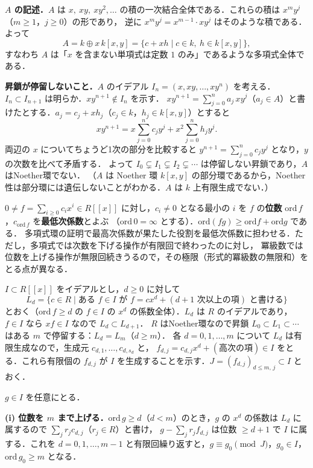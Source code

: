 \textbf{$A$ の記述．}$A$ は $x,\ xy,\ xy^2,\dots$ の積の一次結合全体である．これらの積は $x^my^j$（$m\ge1$，$j\ge0$）の形であり，
逆に $x^my^j=x^{m-1}\cdot xy^j$ はそのような積である．よって
\[
  A=k\oplus x\,k[x,y]=\{c+xh\mid c\in k,\ h\in k[x,y]\},
\]
すなわち $A$ は「$x$ を含まない単項式は定数 $1$ のみ」であるような多項式全体である．

\textbf{昇鎖が停留しないこと．}$A$ のイデアル $I_n=(x,xy,\dots,xy^n)$ を考える．$I_n\subset I_{n+1}$ は明らか．$xy^{n+1}\notin I_n$ を示す．
$xy^{n+1}=\sum_{j=0}^na_j\,xy^j$（$a_j\in A$）と書けたとする．$a_j=c_j+xh_j$（$c_j\in k$，$h_j\in k[x,y]$）とすると
\[
  xy^{n+1}=x\sum_{j=0}^nc_jy^j+x^2\sum_{j=0}^nh_jy^j.
\]
両辺の $x$ についてちょうど1次の部分を比較すると $y^{n+1}=\sum_{j=0}^nc_jy^j$ となり，$y$ の次数を比べて矛盾する．
よって $I_0\subsetneq I_1\subsetneq I_2\subsetneq\cdots$ は停留しない昇鎖であり，$A$ はNoether環でない．
（$A$ は Noether 環 $k[x,y]$ の部分環であるから，Noether 性は部分環には遺伝しないことがわかる．$A$ は $k$ 上有限生成でない．）

$0\ne f=\sum_{i\ge0}c_ix^i\in R[[x]]$ に対し，$c_i\ne0$ となる最小の $i$ を $f$ の\textbf{位数} $\mathrm{ord}\,f$，$c_{\mathrm{ord}\,f}$ を\textbf{最低次係数}とよぶ
（$\mathrm{ord}\,0=\infty$ とする）．$\mathrm{ord}(fg)\ge\mathrm{ord}f+\mathrm{ord}g$ である．
多項式環の証明で最高次係数が果たした役割を最低次係数に担わせる．ただし，多項式では次数を下げる操作が有限回で終わったのに対し，
冪級数では位数を上げる操作が無限回続きうるので，その極限（形式的冪級数の無限和）をとる点が異なる．

$I\subset R[[x]]$ をイデアルとし，$d\ge0$ に対して
\[
  L_d=\{c\in R\mid \text{ある } f\in I \text{ が } f=cx^d+(\text{$d+1$ 次以上の項}) \text{ と書ける}\}
\]
とおく（$\mathrm{ord}\,f\ge d$ の $f\in I$ の $x^d$ の係数全体）．$L_d$ は $R$ のイデアルであり，$f\in I$ なら $xf\in I$ なので $L_d\subset L_{d+1}$．
$R$ はNoether環なので昇鎖 $L_0\subset L_1\subset\cdots$ はある $m$ で停留する：$L_d=L_m$（$d\ge m$）．
各 $d=0,1,\dots,m$ について $L_d$ は有限生成なので，生成元 $c_{d,1},\dots,c_{d,s_d}$ と，
$f_{d,j}=c_{d,j}x^d+(\text{高次の項})\in I$ をとる．これら有限個の $f_{d,j}$ が $I$ を生成することを示す．$J=(f_{d,j})_{d\le m,\,j}\subset I$ とおく．

$g\in I$ を任意にとる．

\textbf{(i) 位数を $m$ まで上げる．}$\mathrm{ord}\,g\ge d$（$d<m$）のとき，$g$ の $x^d$ の係数は $L_d$ に属するので $\sum_jr_jc_{d,j}$（$r_j\in R$）と書け，
$g-\sum_jr_jf_{d,j}$ は位数 $\ge d+1$ で $I$ に属する．これを $d=0,1,\dots,m-1$ と有限回繰り返すと，$g\equiv g_0\pmod J$，$g_0\in I$，$\mathrm{ord}\,g_0\ge m$ となる．


